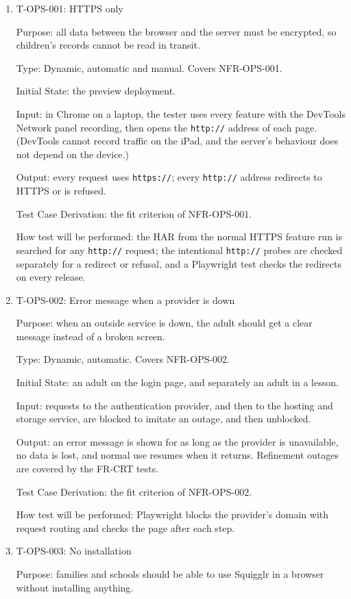 \documentclass[12pt, titlepage]{article}
\newcommand{\testitem}[1]{\item #1\par\nopagebreak}
\begin{document}
\begin{enumerate}

\testitem{T-OPS-001: HTTPS only}

Purpose: all data between the browser and the server must be encrypted, so children's records cannot be read in transit.

Type: Dynamic, automatic and manual. Covers NFR-OPS-001.

Initial State: the preview deployment.

Input: in Chrome on a laptop, the tester uses every feature with the DevTools
Network panel recording, then opens the \texttt{http://} address of each
page. (DevTools cannot record traffic on the iPad, and the server's
behaviour does not depend on the device.)

Output: every request uses \texttt{https://}; every \texttt{http://}
address redirects to HTTPS or is refused.

Test Case Derivation: the fit criterion of NFR-OPS-001.

How test will be performed: the HAR from the normal HTTPS feature run is searched for any \texttt{http://} request; the intentional \texttt{http://} probes are checked separately for a redirect or refusal, and a Playwright test checks the redirects on every release.

\testitem{T-OPS-002: Error message when a provider is down}

Purpose: when an outside service is down, the adult should get a clear message instead of a broken screen.

Type: Dynamic, automatic. Covers NFR-OPS-002.

Initial State: an adult on the login page, and separately an adult in a
lesson.

Input: requests to the authentication provider, and then to the hosting
and storage service, are blocked to imitate an outage, and then
unblocked.

Output: an error message is shown for as long as the provider is
unavailable, no data is lost, and normal use resumes when it returns.
Refinement outages are covered by the FR-CRT tests.

Test Case Derivation: the fit criterion of NFR-OPS-002.

How test will be performed: Playwright blocks the provider's domain with
request routing and checks the page after each step.

\testitem{T-OPS-003: No installation}

Purpose: families and schools should be able to use Squigglr in a browser without installing anything.


\end{enumerate}
\end{document}
